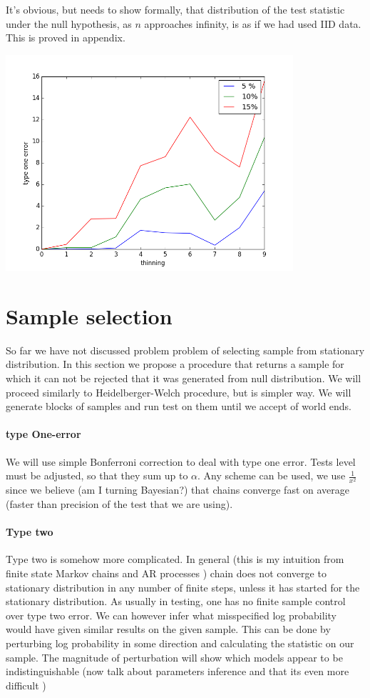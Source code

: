 \documentclass{article}
\begin{document}
It's obvious, but needs to show formally, that distribution of the test statistic under the null hypothesis, as $n$ approaches infinity, is as if we had used IID data. This is proved in appendix.

\includegraphics[width=0.8\textwidth]{type1.png}

\section{Sample selection}
So far we have not discussed problem problem of selecting sample from stationary distribution. In this section we propose a procedure that returns a sample for which it can not be rejected that it was generated from null distribution. We will proceed similarly to Heidelberger-Welch procedure, but is simpler way. We will generate blocks of samples and run test on them until we accept of world ends. 

\paragraph{type One-error}
We will use simple Bonferroni correction to deal with type one error. Tests level must be adjusted, so that they sum up to $\alpha$. Any scheme can be used, we use $\frac{1}{x^2}$ since we believe (am I turning  Bayesian?) that chains converge fast on average (faster than precision of the test that we are using).   

\paragraph{Type two}
Type two is somehow more complicated. In general (this is my intuition from finite state Markov chains and AR processes ) chain does not converge to stationary distribution in any number of finite steps, unless it has started for the stationary distribution. As usually in testing, one has no finite sample control over type two error. We can however infer what misspecified log probability would have given similar results on the given sample. This can be done by perturbing log probability in some direction and calculating the statistic on our sample. The magnitude of perturbation will show which models appear to be indistinguishable (now talk about parameters inference and that its even more difficult )    
\end{document}
